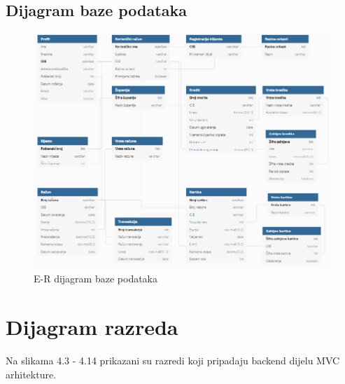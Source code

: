			
			\subsection{Dijagram baze podataka}
			
				\begin{figure}[H]
					\includegraphics[scale=0.9]{Slike/ermodel.PNG}
					\centering
					\caption{E-R dijagram baze podataka}
					\label{fig:dijagram}
				\end{figure}
			\eject
			
			
		\section{Dijagram razreda}
		
		Na slikama 4.3 - 4.14 prikazani su razredi koji pripadaju backend dijelu MVC
		arhitekture.
		
